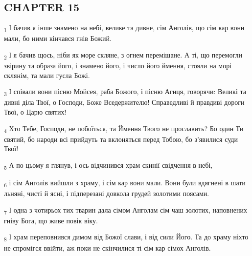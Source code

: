 \subsection{CHAPTER 15}
\begin{tcolorbox}
\textsubscript{1} І бачив я інше знамено на небі, велике та дивне, сім Анголів, що сім кар вони мали, бо ними кінчався гнів Божий.
\end{tcolorbox}
\begin{tcolorbox}
\textsubscript{2} І я бачив щось, ніби як море скляне, з огнем перемішане. А ті, що перемогли звірину та образа його, і знамено його, і число його ймення, стояли на морі склянім, та мали гусла Божі.
\end{tcolorbox}
\begin{tcolorbox}
\textsubscript{3} І співали вони пісню Мойсея, раба Божого, і пісню Агнця, говорячи: Великі та дивні діла Твої, о Господи, Боже Вседержителю! Справедливі й правдиві дороги Твої, о Царю святих!
\end{tcolorbox}
\begin{tcolorbox}
\textsubscript{4} Хто Тебе, Господи, не побоїться, та Ймення Твого не прославить? Бо один Ти святий, бо народи всі прийдуть та вклоняться перед Тобою, бо з'явилися суди Твої!
\end{tcolorbox}
\begin{tcolorbox}
\textsubscript{5} А по цьому я глянув, і ось відчинився храм скинії свідчення в небі,
\end{tcolorbox}
\begin{tcolorbox}
\textsubscript{6} і сім Анголів вийшли з храму, і сім кар вони мали. Вони були вдягнені в шати льняні, чисті й ясні, і підперезані довкола грудей золотими поясами.
\end{tcolorbox}
\begin{tcolorbox}
\textsubscript{7} І одна з чотирьох тих тварин дала сімом Анголам сім чаш золотих, наповнених гніву Бога, що живе повік віку.
\end{tcolorbox}
\begin{tcolorbox}
\textsubscript{8} І храм переповнився димом від Божої слави, і від сили Його. Та до храму ніхто не спромігся ввійти, аж поки не скінчилися ті сім кар сімох Анголів.
\end{tcolorbox}
